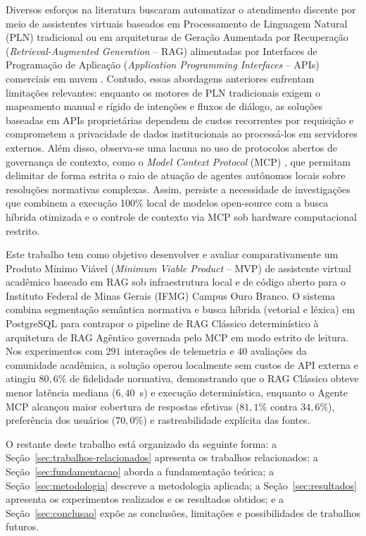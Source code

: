 \documentclass[12pt]{article}
\begin{document}
Diversos esforços na literatura buscaram automatizar o atendimento discente por meio de assistentes virtuais baseados em Processamento de Linguagem Natural (PLN) tradicional \cite{monteiro2021helena} ou em arquiteturas de Geração Aumentada por Recuperação (\textit{Retrieval-Augmented Generation} -- RAG) alimentadas por Interfaces de Programação de Aplicação (\textit{Application Programming Interfaces} -- APIs) comerciais em nuvem \cite{barbosa2023chatbot}. Contudo, essas abordagens anteriores enfrentam limitações relevantes: enquanto os motores de PLN tradicionais exigem o mapeamento manual e rígido de intenções e fluxos de diálogo, as soluções baseadas em APIs proprietárias dependem de custos recorrentes por requisição e comprometem a privacidade de dados institucionais ao processá-los em servidores externos. Além disso, observa-se uma lacuna no uso de protocolos abertos de governança de contexto, como o \textit{Model Context Protocol} (MCP) \cite{sabbag2025mcp}, que permitam delimitar de forma estrita o raio de atuação de agentes autônomos locais sobre resoluções normativas complexas. Assim, persiste a necessidade de investigações que combinem a execução 100\% local de modelos open-source com a busca híbrida otimizada e o controle de contexto via MCP sob hardware computacional restrito.

Este trabalho tem como objetivo desenvolver e avaliar comparativamente um Produto Mínimo Viável (\textit{Minimum Viable Product} -- MVP) de assistente virtual acadêmico baseado em RAG sob infraestrutura local e de código aberto para o Instituto Federal de Minas Gerais (IFMG) Campus Ouro Branco. O sistema combina segmentação semântica normativa e busca híbrida (vetorial e léxica) em PostgreSQL para contrapor o pipeline de RAG Clássico determinístico à arquitetura de RAG Agêntico governada pelo MCP em modo estrito de leitura. Nos experimentos com $291$ interações de telemetria e $40$ avaliações da comunidade acadêmica, a solução operou localmente sem custos de API externa e atingiu $80,6\%$ de fidelidade normativa, demonstrando que o RAG Clássico obteve menor latência mediana ($6,40$~s) e execução determinística, enquanto o Agente MCP alcançou maior cobertura de respostas efetivas ($81,1\%$ contra $34,6\%$), preferência dos usuários ($70,0\%$) e rastreabilidade explícita das fontes.

O restante deste trabalho está organizado da seguinte forma: a Seção~\ref{sec:trabalhos-relacionados} apresenta os trabalhos relacionados; a Seção~\ref{sec:fundamentacao} aborda a fundamentação teórica; a Seção~\ref{sec:metodologia} descreve a metodologia aplicada; a Seção~\ref{sec:resultados} apresenta os experimentos realizados e os resultados obtidos; e a Seção~\ref{sec:conclusao} expõe as conclusões, limitações e possibilidades de trabalhos futuros.
\end{document}
